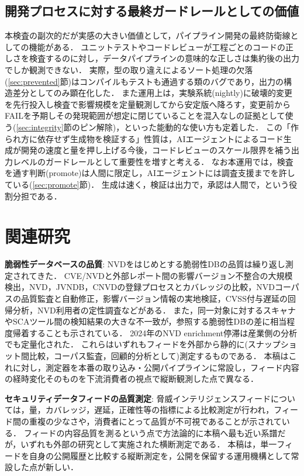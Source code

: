 \documentclass{css}
\begin{document}
\subsection{開発プロセスに対する最終ガードレールとしての価値}
\label{sec:guardrail}

本検査の副次的だが実感の大きい価値として，パイプライン開発の最終防衛線としての機能がある．
ユニットテストやコードレビューが工程ごとのコードの正しさを検査するのに対し，データパイプラインの意味的な正しさは集約後の出力でしか観測できない．
実際，型の取り違えによるソート処理の欠落(\ref{sec:prevented}節)はコンパイルもテストも通過する類のバグであり，出力の構造差分としてのみ顕在化した．
また運用上は，実験系統(nightly)に破壊的変更を先行投入し検査で影響規模を定量観測してから安定版へ降ろす，変更前からFAILを予期しその発現範囲が想定に閉じていることを混入なしの証拠として使う(\ref{sec:integrity}節のピン解除)，といった能動的な使い方も定着した．
この「作られ方に依存せず生成物を検証する」性質は，AIエージェントによるコード生成が開発の速度と量を押し上げる今後，コードレビューのスケール限界を補う出力レベルのガードレールとして重要性を増すと考える．
なお本運用では，検査を通す判断(promote)は人間に限定し，AIエージェントには調査支援までを許している(\ref{sec:promote}節)．
生成は速く，検証は出力で，承認は人間で，という役割分担である．

\section{関連研究}
\label{sec:related}

\textbf{脆弱性データベースの品質}:
NVDをはじめとする脆弱性DBの品質は繰り返し測定されてきた．
CVE/NVDと外部レポート間の影響バージョン不整合の大規模検出\cite{dong19}，NVD，JVNDB，CNVDの登録プロセスとカバレッジの比較\cite{lin26}，NVDコーパスの品質監査と自動修正\cite{anwar22}，影響バージョン情報の実地検証\cite{nguyen13}，CVSS付与遅延の回帰分析\cite{ruohonen19}，NVD利用者の定性調査\cite{wunder24}などがある．
また，同一対象に対するスキャナやSCAツール間の検知結果の大きな不一致が，参照する脆弱性DBの差に相当程度帰着することも示されている\cite{imtiaz21,churakova25}．
2024年のNVD enrichment停滞は産業側の分析でも定量化された\cite{vulncheck24,anchore25}．
これらはいずれもフィードを外部から静的に(スナップショット間比較，コーパス監査，回顧的分析として)測定するものである．
本稿はこれに対し，測定器を本番の取り込み・公開パイプラインに常設し，フィード内容の経時変化そのものを下流消費者の視点で縦断観測した点で異なる．

\textbf{セキュリティデータフィードの品質測定}:
脅威インテリジェンスフィードについては，量，カバレッジ，遅延，正確性等の指標による比較測定が行われ，フィード間の重複の少なさや，消費者にとって品質が不可視であることが示されている\cite{li19,bouwman20,griffioen20}．
フィードの内容品質を測るという点で方法論的に本稿へ最も近い系譜だが，いずれも外部の研究として実施された横断測定である．
本稿は，単一フィードを自身の公開履歴と比較する縦断測定を，公開を保留する運用機構として常設した点が新しい．
\end{document}
